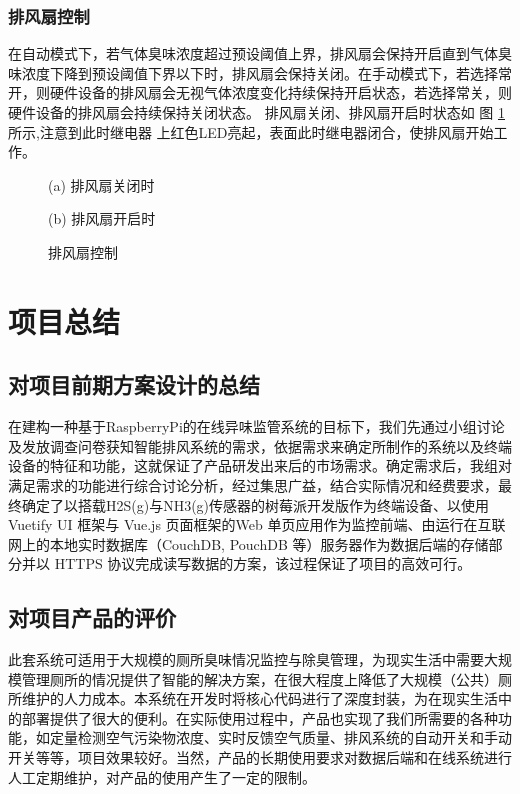 \documentclass[UTF8]{ctexart}
\begin{document}
\subsubsection{排风扇控制}
在自动模式下，若气体臭味浓度超过预设阈值上界，排风扇会保持开启直到气体臭味浓度下降到预设阈值下界以下时，排风扇会保持关闭。在手动模式下，若选择常开，则硬件设备的排风扇会无视气体浓度变化持续保持开启状态，若选择常关，则硬件设备的排风扇会持续保持关闭状态。
排风扇关闭、排风扇开启时状态如 图 \ref{fig:device_onoff} 所示,注意到此时继电器
上红色LED亮起，表面此时继电器闭合，使排风扇开始工作。

\begin{figure}[H]
\centering
\begin{minipage}{0.4\linewidth}

    \noindent{}
	\centerline{(a) 排风扇关闭时}
\end{minipage}
\hfill
\begin{minipage}{0.4\linewidth}

    \noindent{}
	\centerline{(b) 排风扇开启时}
\end{minipage}

\caption{排风扇控制}\label{fig:device_onoff}

\end{figure}


\section{项目总结}
\subsection{对项目前期方案设计的总结}
在建构一种基于RaspberryPi的在线异味监管系统的目标下，我们先通过小组讨论及发放调查问卷获知智能排风系统的需求，依据需求来确定所制作的系统以及终端设备的特征和功能，这就保证了产品研发出来后的市场需求。确定需求后，我组对满足需求的功能进行综合讨论分析，经过集思广益，结合实际情况和经费要求，最终确定了以搭载H2S(g)与NH3(g)传感器的树莓派开发版作为终端设备、以使用 Vuetify UI 框架与 Vue.js 页面框架的Web 单页应用作为监控前端、由运行在互联网上的本地实时数据库（CouchDB, PouchDB 等）服务器作为数据后端的存储部分并以 HTTPS 协议完成读写数据的方案，该过程保证了项目的高效可行。

\subsection{对项目产品的评价}
此套系统可适用于大规模的厕所臭味情况监控与除臭管理，为现实生活中需要大规模管理厕所的情况提供了智能的解决方案，在很大程度上降低了大规模（公共）厕所维护的人力成本。本系统在开发时将核心代码进行了深度封装，为在现实生活中的部署提供了很大的便利。在实际使用过程中，产品也实现了我们所需要的各种功能，如定量检测空气污染物浓度、实时反馈空气质量、排风系统的自动开关和手动开关等等，项目效果较好。当然，产品的长期使用要求对数据后端和在线系统进行人工定期维护，对产品的使用产生了一定的限制。
\end{document}

